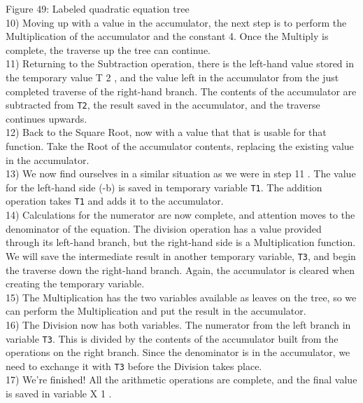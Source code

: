 \documentclass[refcap, oxford]{ahsan}
\begin{document}
Figure 49: Labeled quadratic equation tree\\
10) Moving up with a value in the accumulator, the next step is to perform the Multiplication of the accumulator and the constant 4. Once the Multiply is complete, the traverse up the tree can continue.\\
11) Returning to the Subtraction operation, there is the left-hand value stored in the temporary value T 2 , and the value left in the accumulator from the just completed traverse of the right-hand branch. The contents of the accumulator are subtracted from \texttt{T2}, the result saved in the accumulator, and the traverse continues upwards.\\
12) Back to the Square Root, now with a value that that is usable for that function. Take the Root of the accumulator contents, replacing the existing value in the accumulator.\\
13) We now find ourselves in a similar situation as we were in step 11 . The value for the left-hand side (-b) is saved in temporary variable \texttt{T1}. The addition operation takes \texttt{T1} and adds it to the accumulator.\\
14) Calculations for the numerator are now complete, and attention moves to the denominator of the equation. The division operation has a value provided through its left-hand branch, but the right-hand side is a Multiplication function. We will save the intermediate result in another temporary variable, \texttt{T3}, and begin the traverse down the right-hand branch. Again, the accumulator is cleared when creating the temporary variable.\\
15) The Multiplication has the two variables available as leaves on the tree, so we can perform the Multiplication and put the result in the accumulator.\\
16) The Division now has both variables. The numerator from the left branch in variable \texttt{T3}. This is divided by the contents of the accumulator built from the operations on the right branch. Since the denominator is in the accumulator, we need to exchange it with \texttt{T3} before the Division takes place.\\
17) We're finished! All the arithmetic operations are complete, and the final value is saved in variable X 1 .
\end{document}

